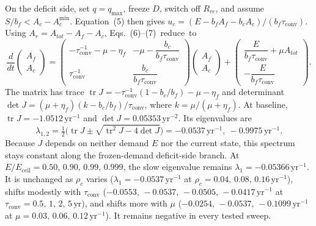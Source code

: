 \documentclass[11pt,a4paper]{article}
\newcommand{\Eceil}{E_{\mathrm{ceil}}}
\newcommand{\Acmin}{A_c^{\min}}
\newcommand{\tconv}{\tau_{\mathrm{conv}}}
\begin{document}
On the deficit side, set $q=q_{\max}$, freeze $D$, switch off $R_{rc}$, and assume $S/b_f<A_c-\Acmin$. Equation~(5) then gives $u_c=(E-b_fA_f-b_cA_c)/(b_f\tconv)$. Using $A_r=A_{tot}-A_f-A_c$, \mbox{Eqs.~(6)--(7) reduce to}
\begin{equation}
\frac{d}{dt}\begin{pmatrix}A_f\\A_c\end{pmatrix}=
\begin{pmatrix}-\tconv^{-1}-\mu-\eta_f & -\mu-\dfrac{b_c}{b_f\tconv}\\[8pt]\tconv^{-1} & \dfrac{b_c}{b_f\tconv}\end{pmatrix}
\begin{pmatrix}A_f\\A_c\end{pmatrix}+
\begin{pmatrix}\dfrac{E}{b_f\tconv}+\mu A_{tot}\\[8pt]-\dfrac{E}{b_f\tconv}\end{pmatrix}.
\end{equation}
The matrix has trace $\operatorname{tr}J=-\tconv^{-1}(1-b_c/b_f)-\mu-\eta_f$ and determinant $\det J=(\mu+\eta_f)(k-b_c/b_f)/\tconv$, where $k=\mu/(\mu+\eta_f)$. At baseline, $\operatorname{tr}J=-1.0512\,\mathrm{yr}^{-1}$ and $\det J=0.05353\,\mathrm{yr}^{-2}$. Its eigenvalues are
\begin{equation}
\lambda_{1,2}=\tfrac12\Big(\operatorname{tr}J\pm\sqrt{\operatorname{tr}^2J-4\det J}\Big)=-0.0537\,\mathrm{yr}^{-1},\ -0.9975\,\mathrm{yr}^{-1}.
\end{equation}
Because $J$ depends on neither demand $E$ nor the current state, this spectrum stays constant along the frozen-demand deficit-side branch. At $E/\Eceil=0.50,\,0.90,\,0.99,\,0.999$, the slow eigenvalue remains $\lambda_1=-0.05366\,\mathrm{yr}^{-1}$. It is unchanged as $\rho_c$ varies ($\lambda_1=-0.0537\,\mathrm{yr}^{-1}$ at $\rho_c=0.04,\,0.08,\,0.16\,\mathrm{yr}^{-1}$), shifts modestly with $\tconv$ ($-0.0553,\,-0.0537,\,-0.0505,\,-0.0417\,\mathrm{yr}^{-1}$ at $\tconv=0.5,\,1,\,2,\,5\,\mathrm{yr}$), and shifts more with $\mu$ ($-0.0254,\,-0.0537,\,-0.1099\,\mathrm{yr}^{-1}$ at $\mu=0.03,\,0.06,\,0.12\,\mathrm{yr}^{-1}$). It remains negative in every tested sweep.
\end{document}
